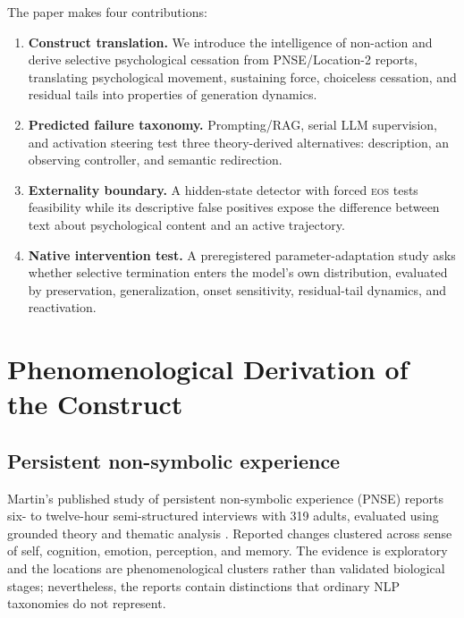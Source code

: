 \documentclass[10pt,twocolumn]{article}
\newcommand{\EOS}{\textsc{eos}}
\begin{document}
The paper makes four contributions:
\begin{enumerate}
    \item \textbf{Construct translation.} We introduce the intelligence of
    non-action and derive selective psychological cessation from PNSE/Location-2
    reports, translating psychological movement, sustaining force, choiceless
    cessation, and residual tails into properties of generation dynamics.
    \item \textbf{Predicted failure taxonomy.} Prompting/RAG, serial LLM
    supervision, and activation steering test three theory-derived alternatives:
    description, an observing controller, and semantic redirection.
    \item \textbf{Externality boundary.} A hidden-state detector with forced
    \EOS{} tests feasibility while its descriptive false positives expose the
    difference between text about psychological content and an active trajectory.
    \item \textbf{Native intervention test.} A preregistered parameter-adaptation
    study asks whether selective termination enters the model's own distribution,
    evaluated by preservation, generalization, onset sensitivity, residual-tail
    dynamics, and reactivation.
\end{enumerate}

\section{Phenomenological Derivation of the Construct}

\subsection{Persistent non-symbolic experience}

Martin's published study of persistent non-symbolic experience (PNSE) reports
six- to twelve-hour semi-structured interviews with 319 adults, evaluated using
grounded theory and thematic analysis \citep{martin2020pnse}. Reported changes
clustered across sense of self,
cognition, emotion, perception, and memory. The evidence is exploratory and the
locations are phenomenological clusters rather than validated biological stages;
nevertheless, the reports contain distinctions that ordinary NLP taxonomies do
not represent.
\end{document}
